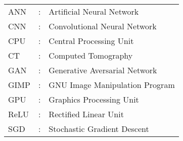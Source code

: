 \begin{tabular}{lcl}
ANN                 &:     & Artificial Neural Network \\
CNN                 &:     & Convolutional Neural Network \\
CPU                 &:     & Central Processing Unit \\
CT                  &:     & Computed Tomography \\
GAN                 &:     & Generative Aversarial Network \\
GIMP                &:     & GNU Image Manipulation Program \\
GPU                 &:     & Graphics Processing Unit \\
ReLU                &:     & Rectified Linear Unit \\
SGD                 &:     & Stochastic Gradient Descent \\
\end{tabular}